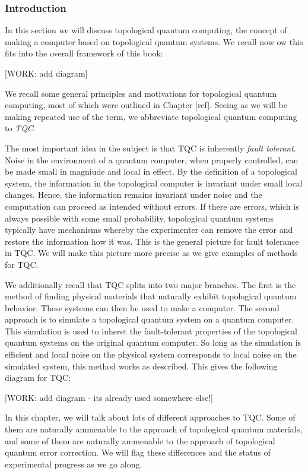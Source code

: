 \documentclass{article}
\theoremstyle{definition}
\newcommand{\0}{\left|0\right>}
\newcommand{\1}{\left|1\right>}
\numberwithin{figure}{section}
\begin{document}
\subsubsection{Introduction}

In this section we will discuss topological quantum computing, the concept of making a computer based on topological quantum systems. We recall now ow this fits into the overall framework of this book:

[WORK: add diagram]

We recall some general principles and motivations for topological quantum computing, most of which were outlined in Chapter [ref]. Seeing as we will be making repeated use of the term, we abbreviate topological quantum computing to \textit{TQC}.

The most important idea in the subject is that TQC is inherently \textit{fault tolerant}. Noise in the environment of a quantum computer, when properly controlled, can be made small in magniude and local in effect. By the definition of a topological system, the information in the topological computer is invariant under small local changes. Hence, the information remains invariant under noise and the computation can proceed as intended without errors. If there are errors, which is always possible with some small probability, topological quantum systems typically have mechanisms whereby the experimenter can remove the error and restore the information how it was. This is the general picture for fault tolerance in TQC. We will make this picture more precise as we give examples of methods for TQC.

We additionally recall that TQC splits into two major branches. The first is the method of finding physical materials that naturally exhibit topological quantum behavior. These systems can then be used to make a computer. The second approach is to simulate a topological quantum system on a quantum computer. This simulation is used to inheret the fault-tolerant properties of the topological quantum systems on the original quantum computer. So long as the simulation is efficient and local noise on the physical system corresponds to local noise on the simulated system, this method works as described. This gives the following diagram for TQC:

[WORK: add diagram - its already used somewhere else!]

In this chapter, we will talk about lots of different approaches to TQC. Some of them are naturally ammenable to the approach of topological quantum materials, and some of them are naturally ammenable to the approach of topological quantum error correction. We will flag these differences and the status of experimental progress as we go along.
\end{document}
